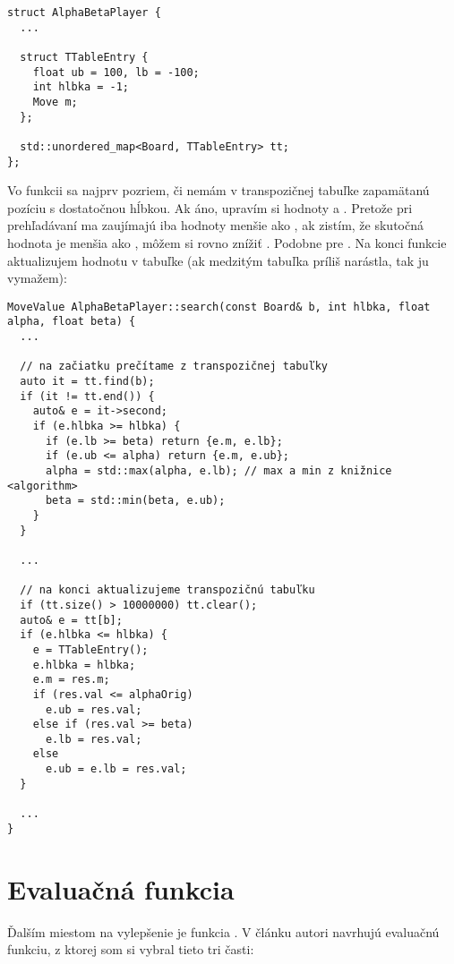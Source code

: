 \begin{lstlisting}
struct AlphaBetaPlayer {
  ...

  struct TTableEntry {
    float ub = 100, lb = -100;
    int hlbka = -1;
    Move m;
  };

  std::unordered_map<Board, TTableEntry> tt;
};
\end{lstlisting}


Vo funkcii  sa najprv pozriem, či nemám v transpozičnej tabuľke zapamätanú pozíciu  s dostatočnou hĺbkou. Ak áno, upravím si hodnoty 
a . Pretože pri prehľadávaní ma zaujímajú iba hodnoty menšie ako , ak zistím, že skutočná hodnota je menšia ako , môžem si 
rovno znížiť . Podobne pre . Na konci funkcie aktualizujem hodnotu v tabuľke (ak medzitým tabuľka príliš narástla, tak ju vymažem):\\

\begin{lstlisting}
MoveValue AlphaBetaPlayer::search(const Board& b, int hlbka, float alpha, float beta) {
  ...
  
  // na začiatku prečítame z transpozičnej tabuľky
  auto it = tt.find(b);
  if (it != tt.end()) {
    auto& e = it->second;
    if (e.hlbka >= hlbka) {
      if (e.lb >= beta) return {e.m, e.lb};
      if (e.ub <= alpha) return {e.m, e.ub};
      alpha = std::max(alpha, e.lb); // max a min z knižnice <algorithm>
      beta = std::min(beta, e.ub);
    }
  }

  ...

  // na konci aktualizujeme transpozičnú tabuľku
  if (tt.size() > 10000000) tt.clear();  
  auto& e = tt[b];
  if (e.hlbka <= hlbka) {
    e = TTableEntry();
    e.hlbka = hlbka;
    e.m = res.m;
    if (res.val <= alphaOrig)
      e.ub = res.val;
    else if (res.val >= beta)
      e.lb = res.val;
    else
      e.ub = e.lb = res.val;
  }

  ...
}
\end{lstlisting}



\section*{Evaluačná funkcia}
Ďalším miestom na vylepšenie je funkcia . V článku
 autori 
navrhujú evaluačnú funkciu, z ktorej som si vybral tieto tri časti:

